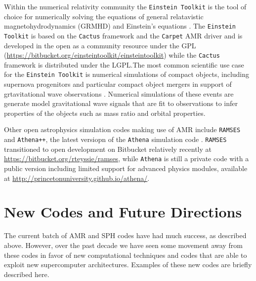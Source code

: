 \documentclass[11pt,twoside]{article}
\begin{document}
Within the numerical relativity community the \texttt{Einstein Toolkit} is the tool of choice for numerically solving the equations of general relatavistic magnetohydrodynamics (GRMHD) and Einstein's equations \citep{loffler2012}. The \texttt{Einstein Toolkit} is based on the \texttt{Cactus} framework and the \texttt{Carpet} AMR driver and is developed in the open as a community resource under the GPL \citep{loffler2013} ({\small \url{https://bitbucket.org/einsteintoolkit/einsteintoolkit}}) while the \texttt{Cactus} framework is distributed under the LGPL.\@  The most common scientific use case for the \texttt{Einstein Toolkit} is numerical simulations of compact objects, including supernova progenitors \citep{mosta2014} and particular compact object mergers in support of grtavitational wave observations \citep{ajith2012}. Numerical simulations of these events are generate model gravitational wave signals that are fit to observations to infer properties of the objects such as mass ratio and orbital properties.

Other open astrophysics simulation codes making use of AMR include \texttt{RAMSES} \citep{teyssier2002} and \texttt{Athena++}, the latest versiopn of the \texttt{Athena} simulation code \citep{stone2008}. \texttt{RAMSES} transitioned to open development on Bitbucket relatively recently at \url{https://bitbucket.org/rteyssie/ramses}, while \texttt{Athena} is still a private code with a public version including limited support for advanced physics modules, available at \url{http://princetonuniversity.github.io/athena/}.

\section{New Codes and Future Directions}
\label{usm}

The current batch of AMR and SPH codes have had much success, as described above. However, over the past decade we have seen some movement away from these codes in favor of new computational techniques and codes that are able to exploit new supercomputer architectures. Examples of these new codes are briefly described here.
\end{document}

